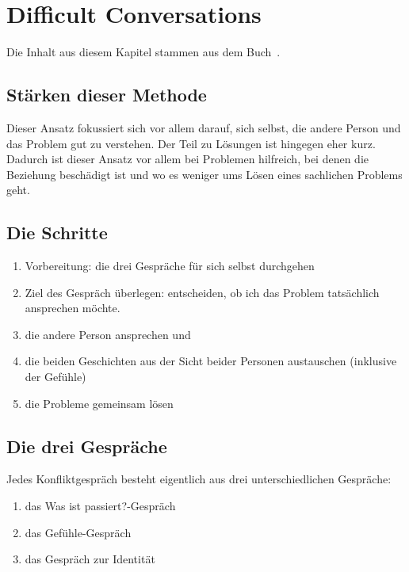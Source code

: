 \section{Difficult Conversations}

Die Inhalt aus diesem Kapitel stammen aus dem Buch~\cite{difficult-conversations}.


\subsection{Stärken dieser Methode}

Dieser Ansatz fokussiert sich vor allem darauf, sich selbst, die andere Person und das Problem gut zu verstehen. Der Teil zu Lösungen ist hingegen eher kurz. Dadurch ist dieser Ansatz vor allem bei Problemen hilfreich, bei denen die Beziehung beschädigt ist und wo es weniger ums Lösen eines sachlichen Problems geht.


\subsection{Die Schritte}

\begin{enumerate}
  \item Vorbereitung: die drei Gespräche für sich selbst durchgehen
  \item Ziel des Gespräch überlegen: entscheiden, ob ich das Problem tatsächlich ansprechen möchte.
  \item die andere Person ansprechen und 
  \item die beiden Geschichten aus der Sicht beider Personen austauschen (inklusive der Gefühle)
  \item die Probleme gemeinsam lösen
\end{enumerate}


\subsection{Die drei Gespräche}

Jedes Konfliktgespräch besteht eigentlich aus drei unterschiedlichen Gespräche:

\begin{enumerate}
  \item das \glqq Was ist passiert?\grqq-Gespräch
  \item das Gefühle-Gespräch
  \item das Gespräch zur Identität
\end{enumerate}

